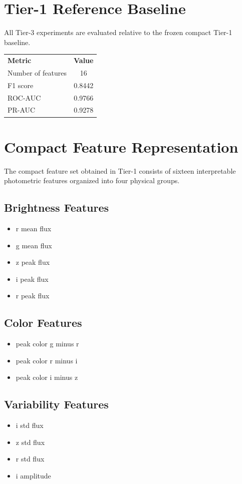\section{Tier-1 Reference Baseline}

All Tier-3 experiments are evaluated relative to the frozen compact Tier-1 baseline.

\begin{center}
\begin{tabular}{l c}
\textbf{Metric} & \textbf{Value} \\
Number of features & 16 \\
F1 score & 0.8442 \\
ROC-AUC & 0.9766 \\
PR-AUC & 0.9278 \\
\end{tabular}
\end{center}

\section{Compact Feature Representation}

The compact feature set obtained in Tier-1 consists of sixteen interpretable
photometric features organized into four physical groups.

\subsection{Brightness Features}
\begin{itemize}
\item r mean flux
\item g mean flux
\item z peak flux
\item i peak flux
\item r peak flux
\end{itemize}

\subsection{Color Features}
\begin{itemize}
\item peak color g minus r
\item peak color r minus i
\item peak color i minus z
\end{itemize}

\subsection{Variability Features}
\begin{itemize}
\item i std flux
\item z std flux
\item r std flux
\item i amplitude
\end{itemize}

